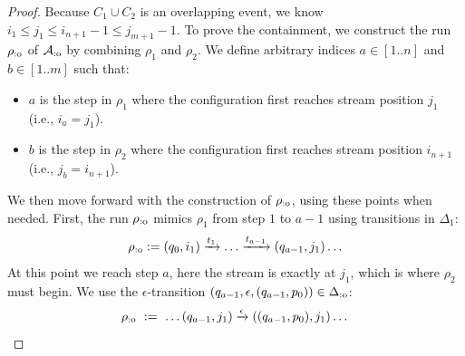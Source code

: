 \begin{proof}
Because $C_1 \cup C_2$ is an overlapping event, we know $i_1 \leq j_1 \leq i_{n+1} - 1 \leq j_{m+1} - 1$.
To prove the containment, we construct the run $\rho_{\text{:o}}$ of $\mathcal{A}_{\text{:o}}$ by combining $\rho_1$ and $\rho_2$. We define arbitrary indices $a \in [1..n]$ and $b \in [1..m]$ such that:
\begin{itemize}
	\item $a$ is the step in $\rho_1$ where the configuration first reaches stream position $j_1$ (i.e., $i_a = j_1$).
	\item $b$ is the step in $\rho_2$ where the configuration first reaches stream position $i_{n+1}$ (i.e., $j_b = i_{n+1}$).
\end{itemize}
We then move forward with the construction of $\rho_{\text{:o}}$, using these points when needed.
First, the run $\rho_{\text{:o}}$ mimics $\rho_1$ from step $1$ to $a-1$ using transitions in $\Delta_1$:
\[ 
\rho_{\text{:o}} := (q_0, i_1) \xrightarrow{t_1} \dots \xrightarrow{t_{a-1}} (q_{a-1}, j_1)  \ldots 
\]
At this point we reach step $a$, here the stream is exactly at $j_1$, which is where $\rho_2$ must begin. We use the $\epsilon$-transition $(q_{a-1}, \epsilon, (q_{a-1}, p_0)) \in \Delta_{\text{:o}}$:
\[ \rho_{\text{:o}} \ := \ \dots (q_{a-1}, j_1) \xrightarrow{\epsilon} ((q_{a-1}, p_0), j_1) \dots \]


\end{proof}
